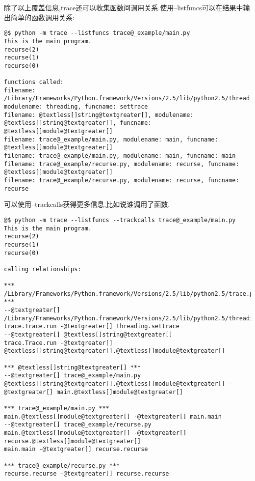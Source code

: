 \documentclass[a4paper,10pt,english]{manual}
\begin{document}
除了以上覆盖信息,trace还可以收集函数间调用关系.使用--listfuncs可以在结果中输出简单的函数调用关系:

\begin{Verbatim}[commandchars=@\[\]]
@$ python -m trace --listfuncs trace@_example/main.py
This is the main program.
recurse(2)
recurse(1)
recurse(0)

functions called:
filename: /Library/Frameworks/Python.framework/Versions/2.5/lib/python2.5/threading.py, modulename: threading, funcname: settrace
filename: @textless[]string@textgreater[], modulename: @textless[]string@textgreater[], funcname: @textless[]module@textgreater[]
filename: trace@_example/main.py, modulename: main, funcname: @textless[]module@textgreater[]
filename: trace@_example/main.py, modulename: main, funcname: main
filename: trace@_example/recurse.py, modulename: recurse, funcname: @textless[]module@textgreater[]
filename: trace@_example/recurse.py, modulename: recurse, funcname: recurse
\end{Verbatim}

可以使用--trackcalls获得更多信息,比如说谁调用了函数.

\begin{Verbatim}[commandchars=@\[\]]
@$ python -m trace --listfuncs --trackcalls trace@_example/main.py
This is the main program.
recurse(2)
recurse(1)
recurse(0)

calling relationships:

*** /Library/Frameworks/Python.framework/Versions/2.5/lib/python2.5/trace.py ***
--@textgreater[] /Library/Frameworks/Python.framework/Versions/2.5/lib/python2.5/threading.py
trace.Trace.run -@textgreater[] threading.settrace
--@textgreater[] @textless[]string@textgreater[]
trace.Trace.run -@textgreater[] @textless[]string@textgreater[].@textless[]module@textgreater[]

*** @textless[]string@textgreater[] ***
--@textgreater[] trace@_example/main.py
@textless[]string@textgreater[].@textless[]module@textgreater[] -@textgreater[] main.@textless[]module@textgreater[]

*** trace@_example/main.py ***
main.@textless[]module@textgreater[] -@textgreater[] main.main
--@textgreater[] trace@_example/recurse.py
main.@textless[]module@textgreater[] -@textgreater[] recurse.@textless[]module@textgreater[]
main.main -@textgreater[] recurse.recurse

*** trace@_example/recurse.py ***
recurse.recurse -@textgreater[] recurse.recurse
\end{Verbatim}
\end{document}
